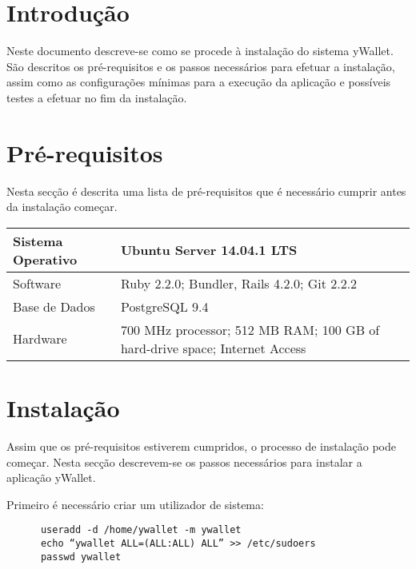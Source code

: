 \documentclass[12pt,a4paper]{article}
\begin{document}


\section*{Introdução}

  Neste documento descreve-se como se procede à instalação do sistema yWallet. São descritos os pré-requisitos e os passos necessários para efetuar a instalação, assim como as configurações mínimas para a execução da aplicação e possíveis testes a efetuar no fim da instalação.

\section*{Pré-requisitos}

  Nesta secção é descrita uma lista de pré-requisitos que é necessário cumprir antes da instalação começar.

\begin{table}[h!]
\begin{tabular}{|l|l|}
\hline
Sistema Operativo & Ubuntu Server 14.04.1 LTS                                                  \\ \hline
Software          & Ruby 2.2.0; Bundler, Rails 4.2.0; Git 2.2.2                                \\ \hline
Base de Dados     & PostgreSQL 9.4                                                             \\ \hline
Hardware          & 700 MHz processor; 512 MB RAM; 100 GB of hard-drive space; Internet Access \\ \hline
\end{tabular}
\end{table}

\section*{Instalação}

  Assim que os pré-requisitos estiverem cumpridos, o processo de instalação pode começar. Nesta secção descrevem-se os passos necessários para instalar a aplicação yWallet.

  Primeiro é necessário criar um utilizador de sistema:

  \begin{verbatim}
      useradd -d /home/ywallet -m ywallet
      echo “ywallet ALL=(ALL:ALL) ALL” >> /etc/sudoers
      passwd ywallet
  \end{verbatim}
\end{document}
